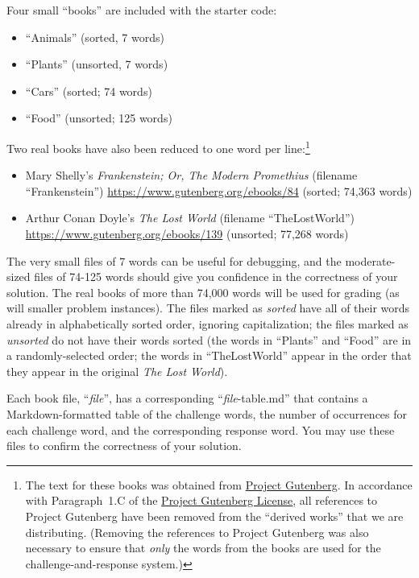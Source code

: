 Four small ``books'' are included with the starter code:

\begin{itemize}
\item ``Animals'' (sorted, 7 words)
\item ``Plants'' (unsorted, 7 words)
\item ``Cars'' (sorted; 74 words)
\item ``Food'' (unsorted; 125 words)
\end{itemize}

Two real books have also been reduced to one word per line:\footnote{The text
for these books was obtained from \href{http://www.gutenberg.org/}{Project
Gutenberg}. In accordance with Paragraph~1.C of the
\href{http://www.gutenberg.org/policy/license}{Project Gutenberg License}, all
references to Project Gutenberg have been removed from the ``derived works''
that we are distributing. (Removing the references to Project Gutenberg was also
necessary to ensure that \textit{only} the words from the books are used for the
challenge-and-response system.)}

\begin{itemize}
\item Mary Shelly's \textit{Frankenstein; Or, The Modern Promethius} (filename
    ``Frankenstein'') \url{https://www.gutenberg.org/ebooks/84} (sorted; 74,363
    words)
\item Arthur Conan Doyle's \textit{The Lost World} (filename ``TheLostWorld'')
    \url{https://www.gutenberg.org/ebooks/139} (unsorted; 77,268 words)
\end{itemize}

The very small files of 7 words can be useful for debugging, and the
moderate-sized files of 74-125 words should give you confidence in the
correctness of your solution. The real books of more than 74,000 words will be
used for grading (as will smaller problem instances). The files marked as
\textit{sorted} have all of their words already in alphabetically sorted order,
ignoring capitalization; the files marked as \textit{unsorted} do not have
their words sorted (the words in ``Plants'' and ``Food'' are in a
randomly-selected order; the words in ``TheLostWorld'' appear in the order that
they appear in the original \textit{The Lost World}).

Each book file, ``\textit{file}'', has a corresponding
``\textit{file}-table.md'' that contains a Markdown-formatted table of the
challenge words, the number of occurrences for each challenge word, and the
corresponding response word. You may use these files to confirm the correctness
of your solution.

